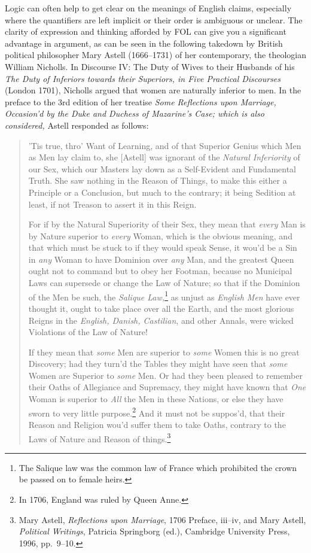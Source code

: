 Logic can often help to get clear on the meanings of English claims,
especially where the quantifiers are left implicit or their order is
ambiguous or unclear. The clarity of expression and thinking afforded
by FOL can give you a significant advantage in argument, as can be
seen in the following takedown by British political philosopher Mary
Astell (1666--1731) of her contemporary, the theologian William
Nicholls. In Discourse IV: The Duty of Wives to their Husbands of his
\textit{The Duty of Inferiors towards their Superiors, in Five
  Practical Discourses} (London 1701), Nicholls argued that women are
naturally inferior to men. In the preface to the 3rd edition of her
treatise \textit{Some Reflections upon Marriage, Occasion'd by the Duke
  and Duchess of Mazarine's Case; which is also considered,} Astell
responded as follows:
\begin{quotation}
'Tis true, thro' Want of Learning, and of that Superior Genius which
Men as Men lay claim to, she [Astell] was ignorant of the
\textit{Natural Inferiority} of our Sex, which our Masters lay down as
a Self-Evident and Fundamental Truth. She saw nothing in the Reason of
Things, to make this either a Principle or a Conclusion, but much to
the contrary; it being Sedition at least, if not Treason to assert it
in this Reign.

For if by the Natural Superiority of their Sex, they mean that
\textit{every} Man is by Nature superior to \textit{every} Woman,
which is the obvious meaning, and that which must be stuck to if they
would speak Sense, it wou'd be a Sin in \textit{any} Woman to have
Dominion over \textit{any} Man, and the greatest Queen ought not to
command but to obey her Footman, because no Municipal Laws can
supersede or change the Law of Nature; so that if the Dominion of the
Men be such, the \textit{Salique Law,}\footnote{The Salique law was
  the common law of France which prohibited the crown be passed on to
  female heirs.} as unjust as \textit{English Men} have ever thought
it, ought to take place over all the Earth, and the most glorious
Reigns in the \textit{English, Danish, Castilian}, and other Annals,
were wicked Violations of the Law of Nature!

If they mean that \textit{some} Men are superior to \textit{some}
Women this is no great Discovery; had they turn'd the Tables they
might have seen that \textit{some} Women are Superior to \textit{some}
Men. Or had they been pleased to remember their Oaths of Allegiance
and Supremacy, they might have known that \textit{One} Woman is
superior to \textit{All} the Men in these Nations, or else they have
sworn to very little purpose.\footnote{In 1706, England was ruled by
  Queen Anne.} And it must not be suppos'd, that their Reason and
Religion wou'd suffer them to take Oaths, contrary to the Laws of
Nature and Reason of things.\footnote{Mary Astell, \textit{Reflections
    upon Marriage}, 1706 Preface, iii--iv, and Mary Astell,
  \textit{Political Writings}, Patricia Springborg (ed.), Cambridge
  University Press, 1996, pp.~9--10.}
\end{quotation}
